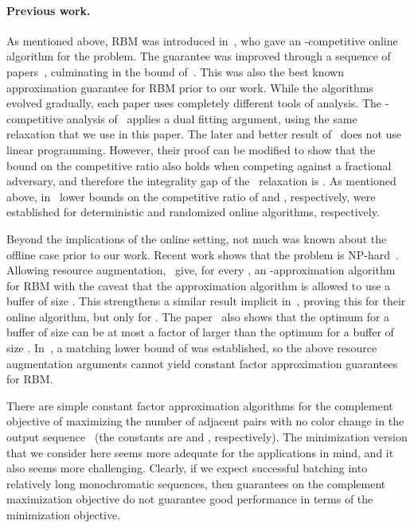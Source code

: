 \documentclass[11pt]{article}
\begin{document}
\paragraph{Previous work.}
As mentioned above, RBM was introduced in~\cite{RSW02}, who gave an
-competitive online algorithm for the problem. The guarantee
was improved through a sequence of papers~\cite{EW05,AR10,ACER11},
culminating in the  bound of~\cite{ACER11}. This was
also the best known approximation guarantee for RBM prior to our work.
While the algorithms evolved gradually, each paper uses completely different
tools of analysis. The -competitive analysis of~\cite{AR10}
applies a dual fitting argument, using the same relaxation that we use in this paper.
The later and better result of~\cite{ACER11} does not use linear programming.
However, their proof can be modified to show that the  bound
on the competitive ratio also holds when competing against a fractional
adversary, and therefore the integrality gap of the~\cite{AR10} relaxation
is . As mentioned above, in~\cite{ACER11} lower bounds
on the competitive ratio of  and
, respectively, were established for deterministic and
randomized online algorithms, respectively.

Beyond the implications of the online setting, not much was known about the
offline case prior to our work. Recent work shows that the problem is
NP-hard~\cite{CMSS10,AKM10}. Allowing resource augmentation,~\cite{CMSS10}
give, for every , an -approximation algorithm for RBM
with the caveat that the approximation algorithm is allowed to use a buffer of
size . This strengthens a similar result implicit in~\cite{EW05},
proving this for their online algorithm, but only for . The
paper~\cite{EW05} also
shows that the optimum for a buffer of size  can be at most a factor of
 larger than the optimum for a buffer of size . In~\cite{Abo08},
a matching  lower bound of  was established, so the above
resource augmentation arguments cannot yield constant factor approximation
guarantees for RBM.

There are simple constant factor approximation algorithms for the complement
objective of maximizing the number of adjacent pairs with no color change in
the output sequence~\cite{KP04,BL07} (the constants are  and , respectively).
The minimization version that we consider
here seems more adequate for the applications in mind, and it also seems more
challenging. Clearly, if we expect successful batching into relatively long
monochromatic sequences, then guarantees on the complement maximization
objective do not guarantee good performance in terms of the minimization
objective.
\end{document}
